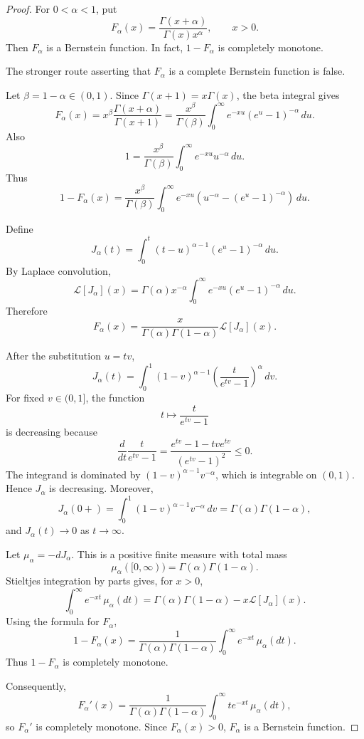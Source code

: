 \begin{proof}
For \(0<\alpha<1\), put
\[
F_\alpha(x)=\frac{\Gamma(x+\alpha)}{\Gamma(x)x^\alpha},\qquad x>0.
\]
Then \(F_\alpha\) is a Bernstein function. In fact, \(1-F_\alpha\) is completely monotone.

The stronger route asserting that \(F_\alpha\) is a complete Bernstein function is false.

Let \(\beta=1-\alpha\in(0,1)\). Since \(\Gamma(x+1)=x\Gamma(x)\), the beta integral gives
\[
F_\alpha(x)
=x^\beta\frac{\Gamma(x+\alpha)}{\Gamma(x+1)}
=\frac{x^\beta}{\Gamma(\beta)}
\int_0^\infty e^{-xu}(e^u-1)^{-\alpha}\,du.
\]
Also
\[
1=\frac{x^\beta}{\Gamma(\beta)}
\int_0^\infty e^{-xu}u^{-\alpha}\,du.
\]
Thus
\[
1-F_\alpha(x)
=\frac{x^\beta}{\Gamma(\beta)}
\int_0^\infty e^{-xu}\left(u^{-\alpha}-(e^u-1)^{-\alpha}\right)\,du.
\]

Define
\[
J_\alpha(t)=\int_0^t (t-u)^{\alpha-1}(e^u-1)^{-\alpha}\,du.
\]
By Laplace convolution,
\[
\mathcal L[J_\alpha](x)
=\Gamma(\alpha)x^{-\alpha}
\int_0^\infty e^{-xu}(e^u-1)^{-\alpha}\,du.
\]
Therefore
\[
F_\alpha(x)
=\frac{x}{\Gamma(\alpha)\Gamma(1-\alpha)}\mathcal L[J_\alpha](x).
\]

After the substitution \(u=tv\),
\[
J_\alpha(t)=
\int_0^1
(1-v)^{\alpha-1}
\left(\frac{t}{e^{tv}-1}\right)^\alpha\,dv.
\]
For fixed \(v\in(0,1]\), the function
\[
t\mapsto \frac{t}{e^{tv}-1}
\]
is decreasing because
\[
\frac{d}{dt}\frac{t}{e^{tv}-1}
=
\frac{e^{tv}-1-tv e^{tv}}{(e^{tv}-1)^2}\le0.
\]
The integrand is dominated by \((1-v)^{\alpha-1}v^{-\alpha}\), which is integrable on \((0,1)\). Hence \(J_\alpha\) is decreasing. Moreover,
\[
J_\alpha(0+)
=\int_0^1(1-v)^{\alpha-1}v^{-\alpha}\,dv
=\Gamma(\alpha)\Gamma(1-\alpha),
\]
and \(J_\alpha(t)\to0\) as \(t\to\infty\).

Let \(\mu_\alpha=-dJ_\alpha\). This is a positive finite measure with total mass
\[
\mu_\alpha([0,\infty))=\Gamma(\alpha)\Gamma(1-\alpha).
\]
Stieltjes integration by parts gives, for \(x>0\),
\[
\int_0^\infty e^{-xt}\,\mu_\alpha(dt)
=
\Gamma(\alpha)\Gamma(1-\alpha)-x\mathcal L[J_\alpha](x).
\]
Using the formula for \(F_\alpha\),
\[
1-F_\alpha(x)
=
\frac{1}{\Gamma(\alpha)\Gamma(1-\alpha)}
\int_0^\infty e^{-xt}\,\mu_\alpha(dt).
\]
Thus \(1-F_\alpha\) is completely monotone.

Consequently,
\[
F_\alpha'(x)
=
\frac{1}{\Gamma(\alpha)\Gamma(1-\alpha)}
\int_0^\infty t e^{-xt}\,\mu_\alpha(dt),
\]
so \(F_\alpha'\) is completely monotone. Since \(F_\alpha(x)>0\), \(F_\alpha\) is a Bernstein function.


\end{proof}
